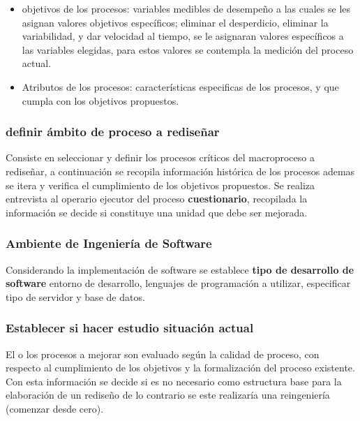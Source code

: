 \documentclass[11pt]{article}
\providecommand{\tightlist}{%
      \setlength{\itemsep}{0pt}\setlength{\parskip}{0pt}}
\begin{document}
\begin{itemize}
\tightlist
\item
  objetivos de los procesos: variables medibles de desempeño a las
  cuales se les asignan valores objetivos específicos; eliminar el
  desperdicio, eliminar la variabilidad, y dar velocidad al tiempo, se
  le asignaran valores específicos a las variables elegidas, para estos
  valores se contempla la medición del proceso actual.
\item
  Atributos de los procesos: características especificas de los
  procesos, y que cumpla con los objetivos propuestos.
\end{itemize}

\hypertarget{definir-uxe1mbito-de-proceso-a-rediseuxf1ar}{%
\subsubsection{definir ámbito de proceso a
rediseñar}\label{definir-uxe1mbito-de-proceso-a-rediseuxf1ar}}

Consiste en seleccionar y definir los procesos críticos del macroproceso
a rediseñar, a continuación se recopila información histórica de los
procesos ademas se itera y verifica el cumplimiento de los objetivos
propuestos. Se realiza entrevista al operario ejecutor del proceso
\textbf{cuestionario}, recopilada la información se decide si constituye
una unidad que debe ser mejorada.

\hypertarget{ambiente-de-ingenieruxeda-de-software}{%
\subsubsection{Ambiente de Ingeniería de
Software}\label{ambiente-de-ingenieruxeda-de-software}}

Considerando la implementación de software se establece \textbf{tipo de
desarrollo de software} entorno de desarrollo, lenguajes de programación
a utilizar, especificar tipo de servidor y base de datos.

\hypertarget{establecer-si-hacer-estudio-situaciuxf3n-actual}{%
\subsubsection{Establecer si hacer estudio situación
actual}\label{establecer-si-hacer-estudio-situaciuxf3n-actual}}

El o los procesos a mejorar son evaluado según la calidad de proceso,
con respecto al cumplimiento de los objetivos y la formalización del
proceso existente. Con esta información se decide si es no necesario
como estructura base para la elaboración de un rediseño de lo contrario
se este realizaría una reingeniería (comenzar desde cero).
\end{document}
